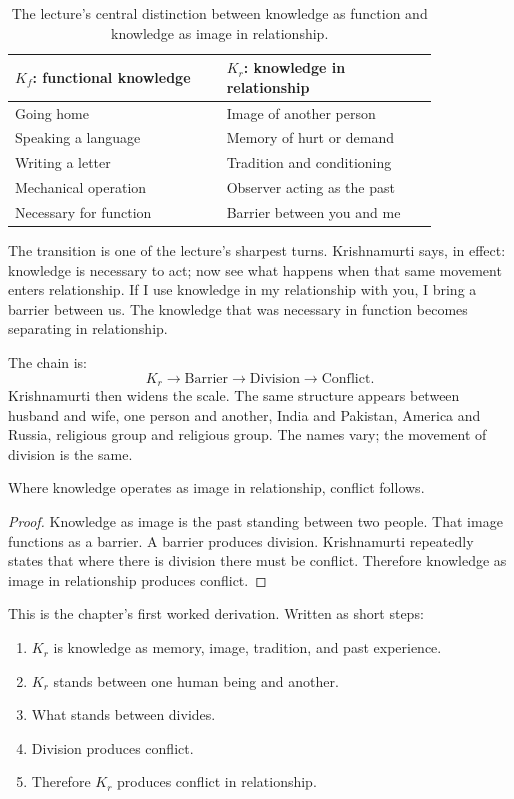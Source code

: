 \begin{table}
\centering
\begin{tabular}{p{0.42\linewidth} p{0.42\linewidth}}
\hline
\(K_f\): functional knowledge & \(K_r\): knowledge in relationship \\
\hline
Going home & Image of another person \\
Speaking a language & Memory of hurt or demand \\
Writing a letter & Tradition and conditioning \\
Mechanical operation & Observer acting as the past \\
Necessary for function & Barrier between you and me \\
\hline
\end{tabular}
\caption{The lecture's central distinction between knowledge as function and knowledge as image in relationship.}
\end{table}

The transition is one of the lecture's sharpest turns. Krishnamurti says, in effect: knowledge is necessary to act; now see what happens when that same movement enters relationship. If I use knowledge in my relationship with you, I bring a barrier between us. The knowledge that was necessary in function becomes separating in relationship.

The chain is:
\begin{equation}
K_r
\longrightarrow
\mathrm{Barrier}
\longrightarrow
\mathrm{Division}
\longrightarrow
\mathrm{Conflict}.
\end{equation}
Krishnamurti then widens the scale. The same structure appears between husband and wife, one person and another, India and Pakistan, America and Russia, religious group and religious group. The names vary; the movement of division is the same.

\begin{proposition}
Where knowledge operates as image in relationship, conflict follows.
\end{proposition}

\begin{proof}
Knowledge as image is the past standing between two people. That image functions as a barrier. A barrier produces division. Krishnamurti repeatedly states that where there is division there must be conflict. Therefore knowledge as image in relationship produces conflict.
\end{proof}

This is the chapter's first worked derivation. Written as short steps:
\begin{enumerate}
\item \(K_r\) is knowledge as memory, image, tradition, and past experience.
\item \(K_r\) stands between one human being and another.
\item What stands between divides.
\item Division produces conflict.
\item Therefore \(K_r\) produces conflict in relationship.
\end{enumerate}

